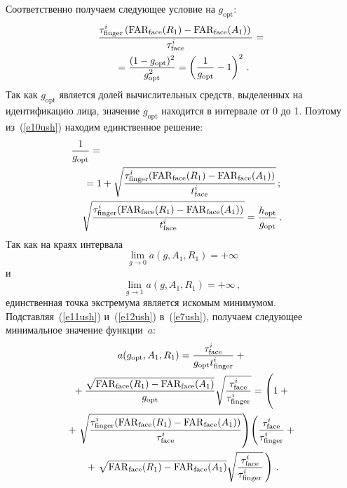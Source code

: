 \begin{multicols}{2}
     Соответственно получаем следующее условие на $g_{\mathrm{opt}}$:
     \begin{multline}
     \displaystyle\frac{\displaystyle \tau^i_{\mathrm{finger}}\left ( \mathrm{FAR}_{\mathrm{face}} (R_1)-
\mathrm{FAR}_{\mathrm{face}}(A_1)\right )\mathstrut}{\displaystyle  \tau^i_{\mathrm{face}}\mathstrut} ={}\\
{}= \displaystyle\frac{\displaystyle (1-
g_{\mathrm{opt}})^2\mathstrut}{\displaystyle g^2_{\mathrm{opt}}\mathstrut} = \left ( \displaystyle\frac{\displaystyle 1\mathstrut}{\displaystyle g_{\mathrm{opt}}\mathstrut} -1\right )^2\,.
     \label{e10ush}
     \end{multline}
     Так как $g_{\mathrm{opt}}$ является долей вычислительных средств,
выделенных на идентификацию лица, значение $g_{\mathrm{opt}}$ находится в
интервале от 0 до 1. Поэтому из~(\ref{e10ush}) находим единственное решение:
     \begin{gather}
     \fr{1}{g_{\mathrm{opt}}}  ={}\hspace*{68mm}\notag\\
     {}=  1+\sqrt{\fr{\tau^i_{\mathrm{finger}}
(\mathrm{FAR}_{\mathrm{face}}(R_1)-
\mathrm{FAR}_{\mathrm{face}}(A_1))}{t^i_{\mathrm{face}}}}\,;\label{e11ush}\\
     \sqrt{\fr{\tau^i_{\mathrm{finger}} (\mathrm{FAR}_{\mathrm{face}}(R_1)-
\mathrm{FAR}_{\mathrm{face}}(A_1))}{t^i_{\mathrm{face}}}}  =
\fr{h_{\mathrm{opt}}}{g_{\mathrm{opt}}}\,.\label{e12ush}
     \end{gather}
     Так как на краях интервала
     $$
     \underset{g\rightarrow 0}{\lim} a(g,A_1,R_1)=+\infty$$
     и
     $$ \underset{g\rightarrow
1}{\lim} a(g,A_1,R_1)=+\infty\,,
     $$
      единственная точка экстремума является искомым минимумом.
Подставляя~(\ref{e11ush}) и~(\ref{e12ush}) в~(\ref{e7ush}), получаем следующее
     минимальное значение функции~$a$:
     \begin{multline*}
     a(g_{\mathrm{opt}}, A_1 , R_1) = \fr{\tau^i_{\mathrm{face}}}{g_{\mathrm{opt}}
t^i_{\mathrm{finger}}}+{}\\
{}+
\fr{\sqrt{\mathrm{FAR}_{\mathrm{face}}(R_1)-
\mathrm{FAR}_{\mathrm{face}}(A_1)}}{g_{\mathrm{opt}}}\sqrt{\fr{\tau^i_{\mathrm{face}}}{\tau^i_{\mathrm{finger}}}}=
 \left ( \vphantom{\sqrt{\fr{\tau^i_{\mathrm{finger}} (\mathrm{FAR}_{\mathrm{face}}
(R_1)-\mathrm{FAR}_{\mathrm{face}}(A_1))}{\tau^i_{\mathrm{face}}}}}
 1+{}\right.\\
 {}+\left.\sqrt{\fr{\tau^i_{\mathrm{finger}} (\mathrm{FAR}_{\mathrm{face}}
(R_1)-\mathrm{FAR}_{\mathrm{face}}(A_1))}{\tau^i_{\mathrm{face}}}} \right )\!
 \left (
\fr{\tau^i_{\mathrm{face}}}{\tau^i_{\mathrm{finger}}}+{}\right.\\
{}+\left.\sqrt{\mathrm{FAR}_{\mathrm{face}}(R_1)-
\mathrm{FAR}_{\mathrm{face}}(A_1)}\sqrt{\fr{\tau^i_{\mathrm{face}}}{\tau^i_{\mathrm{finger}}}}\,\right )\,.
     \end{multline*}
     

\end{multicols}

